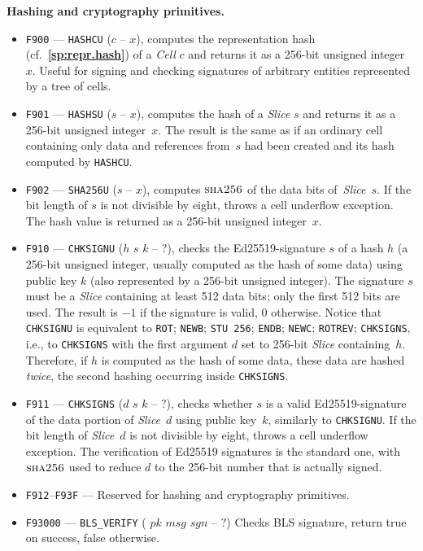 \documentclass[12pt,oneside]{article}
\def\makepoint#1{\medbreak\noindent{\bf #1.\ }}
\def\nxsubpoint{\refstepcounter{subsubsection}%
  \smallbreak\makepoint{\thesubsubsection}}
\def\refpoint#1{{\rm\textbf{\ref{#1}}}}
\let\ptref=\refpoint
\def\emb#1{\textbf{#1.}}
\def\opsc#1{\operatorname{\textsc{#1}}}
\def\Sha{\opsc{sha256}}
\begin{document}
\nxsubpoint\emb{Hashing and cryptography primitives}
\begin{itemize}
\item {\tt F900} --- {\tt HASHCU} ($c$ -- $x$), computes the representation hash (cf.~\ptref{sp:repr.hash}) of a {\em Cell\/} $c$ and returns it as a 256-bit unsigned integer~$x$. Useful for signing and checking signatures of arbitrary entities represented by a tree of cells.
\item {\tt F901} --- {\tt HASHSU} ($s$ -- $x$), computes the hash of a {\em Slice\/} $s$ and returns it as a 256-bit unsigned integer~$x$. The result is the same as if an ordinary cell containing only data and references from~$s$ had been created and its hash computed by {\tt HASHCU}.
\item {\tt F902} --- {\tt SHA256U} ($s$ -- $x$), computes $\Sha$ of the data bits of~{\em Slice\/}~$s$. If the bit length of $s$ is not divisible by eight, throws a cell underflow exception. The hash value is returned as a 256-bit unsigned integer~$x$.
\item {\tt F910} --- {\tt CHKSIGNU} ($h$ $s$ $k$ -- $?$), checks the Ed25519-signature $s$ of a hash $h$ (a 256-bit unsigned integer, usually computed as the hash of some data) using public key $k$ (also represented by a 256-bit unsigned integer). The signature $s$ must be a {\em Slice\/} containing at least 512 data bits; only the first 512 bits are used. The result is $-1$ if the signature is valid, $0$ otherwise. Notice that {\tt CHKSIGNU} is equivalent to {\tt ROT}; {\tt NEWB}; {\tt STU 256}; {\tt ENDB}; {\tt NEWC}; {\tt ROTREV}; {\tt CHKSIGNS}, i.e., to {\tt CHKSIGNS} with the first argument $d$ set to 256-bit {\em Slice} containing~$h$. Therefore, if $h$ is computed as the hash of some data, these data are hashed {\em twice}, the second hashing occurring inside {\tt CHKSIGNS}. 
\item {\tt F911} --- {\tt CHKSIGNS} ($d$ $s$ $k$ -- $?$), checks whether $s$ is a valid Ed25519-signature of the data portion of {\em Slice\/}~$d$ using public key~$k$, similarly to {\tt CHKSIGNU}. If the bit length of {\em Slice\/}~$d$ is not divisible by eight, throws a cell underflow exception. The verification of Ed25519 signatures is the standard one, with $\Sha$ used to reduce $d$ to the 256-bit number that is actually signed. 
\item {\tt F912}--{\tt F93F} --- Reserved for hashing and cryptography primitives.
\item {\tt F93000} --- {\tt BLS_VERIFY} ( $pk$ $msg$ $sgn$ -- $?$) Checks BLS signature, return true on success, false otherwise.

\end{itemize}
\end{document}
